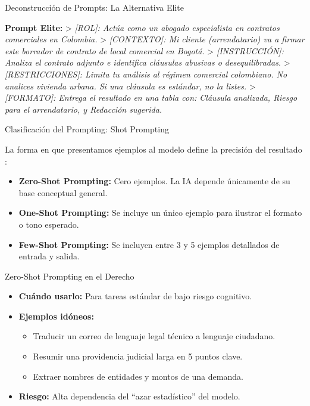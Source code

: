 \documentclass[aspectratio=169]{beamer}
\begin{document}
\begin{frame}[fragile]{Deconstrucción de Prompts: La Alternativa Elite}


\textbf{Prompt Elite:}
> \textit{[ROL]: Actúa como un abogado especialista en contratos comerciales en Colombia.}
> \textit{[CONTEXTO]: Mi cliente (arrendatario) va a firmar este borrador de contrato de local comercial en Bogotá.}
> \textit{[INSTRUCCIÓN]: Analiza el contrato adjunto e identifica cláusulas abusivas o desequilibradas.}
> \textit{[RESTRICCIONES]: Limita tu análisis al régimen comercial colombiano. No analices vivienda urbana. Si una cláusula es estándar, no la listes.}
> \textit{[FORMATO]: Entrega el resultado en una tabla con: Cláusula analizada, Riesgo para el arrendatario, y Redacción sugerida.}


\end{frame}



\begin{frame}[fragile]{Clasificación del Prompting: Shot Prompting}


La forma en que presentamos ejemplos al modelo define la precisión del resultado \cite{murray2024}:

\begin{itemize}
  \item \textbf{Zero-Shot Prompting:} Cero ejemplos. La IA depende únicamente de su base conceptual general.
  \item \textbf{One-Shot Prompting:} Se incluye un único ejemplo para ilustrar el formato o tono esperado.
  \item \textbf{Few-Shot Prompting:} Se incluyen entre 3 y 5 ejemplos detallados de entrada y salida.
\end{itemize}
\end{frame}



\begin{frame}[fragile]{Zero-Shot Prompting en el Derecho}


\begin{itemize}
  \item \textbf{Cuándo usarlo:} Para tareas estándar de bajo riesgo cognitivo.
  \item \textbf{Ejemplos idóneos:}
  \begin{itemize}
    \item Traducir un correo de lenguaje legal técnico a lenguaje ciudadano.
    \item Resumir una providencia judicial larga en 5 puntos clave.
    \item Extraer nombres de entidades y montos de una demanda.
  \end{itemize}
  \item \textbf{Riesgo:} Alta dependencia del ``azar estadístico'' del modelo.
\end{itemize}
\end{frame}
\end{document}
